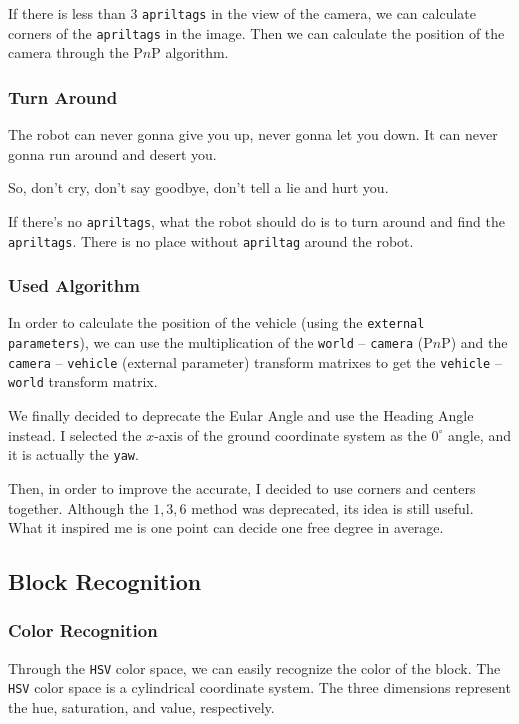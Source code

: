 \documentclass{article}
\begin{document}
If there is less than $3$ \texttt{apriltags} in the view of the camera, we can calculate corners of the \texttt{apriltags} in the image. Then we can calculate the position of the camera through the P$n$P algorithm.

\subsubsection{Turn Around}
The robot can never gonna give you up, never gonna let you down. It can never gonna run around and desert you.

So, don't cry, don't say goodbye, don't tell a lie and hurt you.

If there's no \texttt{apriltags}, what the robot should do is to turn around and find the \texttt{apriltags}. There is no place without \texttt{apriltag} around the robot.

\subsubsection{Used Algorithm}

In order to calculate the position of the vehicle (using the \texttt{external parameters}), we can use the multiplication of the \texttt{world} -- \texttt{camera} (P$n$P) and the \texttt{camera} -- \texttt{vehicle} (external parameter) transform matrixes to get the \texttt{vehicle} -- \texttt{world} transform matrix.

We finally decided to deprecate the Eular Angle and use the Heading Angle instead. I selected the $x$-axis of the ground coordinate system as the $0^\circ$ angle, and it is actually the \texttt{yaw}.

Then, in order to improve the accurate, I decided to use corners and centers together. Although the $1, 3, 6$ method was deprecated, its idea is still useful. What it inspired me is one point can decide one free degree in average.

\subsection{Block Recognition}

\subsubsection{Color Recognition}
Through the \texttt{HSV} color space, we can easily recognize the color of the block. The \texttt{HSV} color space is a cylindrical coordinate system. The three dimensions represent the hue, saturation, and value, respectively.
\end{document}
